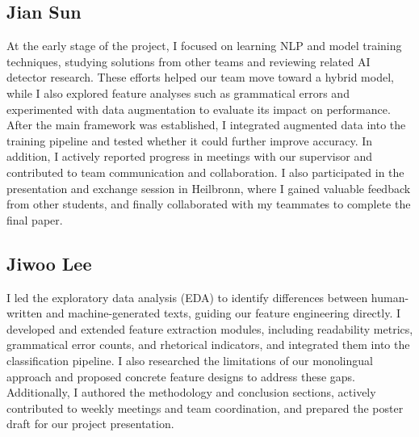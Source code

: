 \documentclass[11pt]{article}
\begin{document}
\subsection{Jian Sun}
At the early stage of the project, I focused on learning NLP and model training techniques, studying solutions from other teams and reviewing related AI detector research. These efforts helped our team move toward a hybrid model, while I also explored feature analyses such as grammatical errors and experimented with data augmentation to evaluate its impact on performance. After the main framework was established, I integrated augmented data into the training pipeline and tested whether it could further improve accuracy. In addition, I actively reported progress in meetings with our supervisor and contributed to team communication and collaboration. I also participated in the presentation and exchange session in Heilbronn, where I gained valuable feedback from other students, and finally collaborated with my teammates to complete the final paper.
\subsection{Jiwoo Lee}
I led the exploratory data analysis (EDA) to identify differences between human-written and machine-generated texts, guiding our feature engineering directly. I developed and extended feature extraction modules, including readability metrics, grammatical error counts, and rhetorical indicators, and integrated them into the classification pipeline. I also researched the limitations of our monolingual approach and proposed concrete feature designs to address these gaps. Additionally, I authored the methodology and conclusion sections, actively contributed to weekly meetings and team coordination, and prepared the poster draft for our project presentation.
\end{document}
